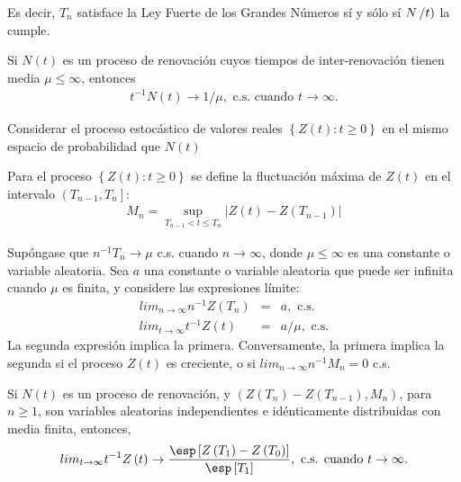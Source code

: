 Es decir, $T_{n}$ satisface la Ley Fuerte de los Grandes N\'umeros s\'i y s\'olo s\'i $N\left/t\right)$ la cumple.


\begin{Coro}
Si $N\left(t\right)$ es un proceso de renovaci\'on cuyos tiempos de inter-renovaci\'on tienen media $\mu\leq\infty$, entonces
\begin{eqnarray}
t^{-1}N\left(t\right)\rightarrow 1/\mu,\textrm{ c.s. cuando }t\rightarrow\infty.
\end{eqnarray}

\end{Coro}


Considerar el proceso estoc\'astico de valores reales $\left\{Z\left(t\right):t\geq0\right\}$ en el mismo espacio de probabilidad que $N\left(t\right)$

\begin{Def}
Para el proceso $\left\{Z\left(t\right):t\geq0\right\}$ se define la fluctuaci\'on m\'axima de $Z\left(t\right)$ en el intervalo $\left(T_{n-1},T_{n}\right]$:
\begin{eqnarray*}
M_{n}=\sup_{T_{n-1}<t\leq T_{n}}|Z\left(t\right)-Z\left(T_{n-1}\right)|
\end{eqnarray*}
\end{Def}

\begin{Teo}
Sup\'ongase que $n^{-1}T_{n}\rightarrow\mu$ c.s. cuando $n\rightarrow\infty$, donde $\mu\leq\infty$ es una constante o variable aleatoria. Sea $a$ una constante o variable aleatoria que puede ser infinita cuando $\mu$ es finita, y considere las expresiones l\'imite:
\begin{eqnarray}
lim_{n\rightarrow\infty}n^{-1}Z\left(T_{n}\right)&=&a,\textrm{ c.s.}\\
lim_{t\rightarrow\infty}t^{-1}Z\left(t\right)&=&a/\mu,\textrm{ c.s.}
\end{eqnarray}
La segunda expresi\'on implica la primera. Conversamente, la primera implica la segunda si el proceso $Z\left(t\right)$ es creciente, o si $lim_{n\rightarrow\infty}n^{-1}M_{n}=0$ c.s.
\end{Teo}

\begin{Coro}
Si $N\left(t\right)$ es un proceso de renovaci\'on, y $\left(Z\left(T_{n}\right)-Z\left(T_{n-1}\right),M_{n}\right)$, para $n\geq1$, son variables aleatorias independientes e id\'enticamente distribuidas con media finita, entonces,
\begin{eqnarray}
lim_{t\rightarrow\infty}t^{-1}Z\left(t\right)\rightarrow\frac{\esp\left[Z\left(T_{1}\right)-Z\left(T_{0}\right)\right]}{\esp\left[T_{1}\right]},\textrm{ c.s. cuando  }t\rightarrow\infty.
\end{eqnarray}
\end{Coro}


